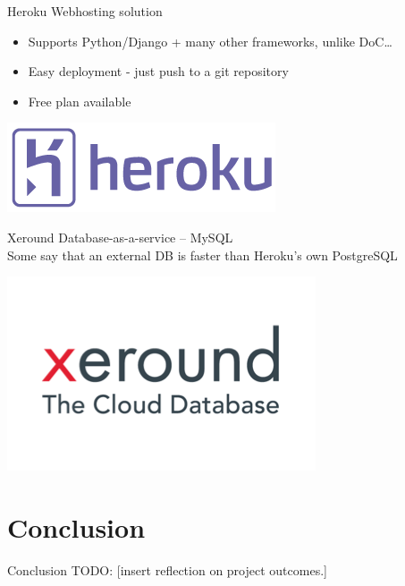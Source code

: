 \documentclass{beamer}
\begin{document}
\begin{frame}{Heroku}
  Webhosting solution
  \begin{itemize}
    \item Supports Python/Django + many other frameworks, unlike DoC\ldots
    \item Easy deployment - just push to a git repository
    \item Free plan available
  \end{itemize}
  \vspace{\baselineskip}
  \begin{center}
    \includegraphics[scale=0.25]{heroku.png} \\
  \end{center}
\end{frame}

\begin{frame}{Xeround}
  Database-as-a-service -- MySQL \\
  \vspace{\baselineskip}
  Some say that an external DB is faster than Heroku's own PostgreSQL
  \vspace{\baselineskip}
  \begin{center}
    \includegraphics[scale=0.25]{xeround.png} \\
  \end{center}
\end{frame}

\section{Conclusion}

\begin{frame}{Conclusion}
  TODO:
  [insert reflection on project outcomes.]
\end{frame}
\end{document}
